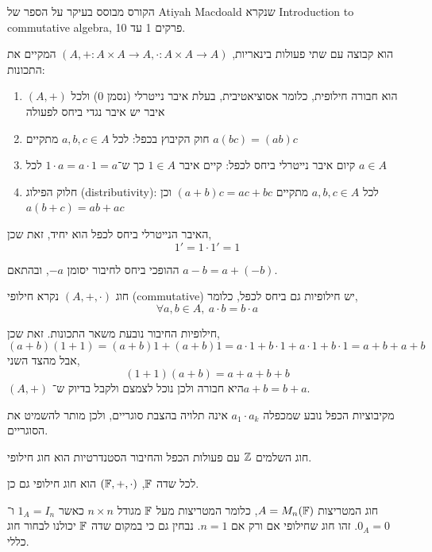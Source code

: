 הקורס מבוסס בעיקר על הספר של Atiyah Macdoald שנקרא Introduction to commutative algebra, פרקים 1 עד 10.
\begin{definition}[חוג]
	הוא קבוצה עם שתי פעולות בינאריות, $(A, + : A \times A \to A, \cdot : A \times A \to A)$ המקיים את התכונות:
	\begin{enumerate}
		\item $(A, +)$ הוא חבורה חילופית, כלומר אסוציאטיבית, בעלת איבר נייטרלי (נסמן $0$) ולכל איבר יש איבר נגדי ביחס לפעולה
		\item חוק הקיבוץ בכפל: לכל $a, b, c \in A$ מתקיים $a (b c) = (a b) c$
		\item קיום איבר נייטרלי ביחס לכפל: קיים איבר $1 \in A$ כך ש־$1 \cdot a = a \cdot 1 = a$ לכל $a \in A$
		\item חלוק הפילוג (distributivity): לכל $a, b, c \in A$ מתקיים $(a + b) c = a c + b c$ וכן $a (b + c) = a b + a c$
	\end{enumerate}
\end{definition}
\begin{remark}
	האיבר הנייטרלי ביחס לכפל הוא יחיד, זאת שכן,
	\[
		1'
		= 1 \cdot 1'
		= 1
	\]
\end{remark}
\begin{notation}
	ההופכי ביחס לחיבור יסומן $-a$, ובהתאם $a - b = a + (-b)$.
\end{notation}
\begin{definition}
	חוג $(A, +, \cdot)$ נקרא חילופי (commutative) יש חילופיות גם ביחס לכפל, כלומר,
	\[
		\forall a, b \in A,\ 
		a \cdot b = b \cdot a
	\]
\end{definition}
\begin{remark}
	חילופיות החיבור נובעת משאר התכונות.
	זאת שכן,
	\[
		(a + b) (1 + 1)
		= (a + b) 1 + (a + b) 1
		= a \cdot 1 + b \cdot 1 + a \cdot 1 + b \cdot 1
		= a + b + a + b
	\]
	אבל מהצד השני,
	\[
		(1 + 1) (a + b)
		= a + a + b + b
	\]
	$(A, +)$ היא חבורה ולכן נוכל לצמצם ולקבל בדיוק ש־$a + b = b + a$.
\end{remark}
\begin{remark}
	מקיבוציות הכפל נובע שמכפלה $a_1 \cdot a_k$ אינה תלויה בהצבת סוגריים, ולכן מותר להשמיט את הסוגריים.
\end{remark}
\begin{example}
	חוג השלמים $\mathbb{Z}$ עם פעולות הכפל והחיבור הסטנדרטיות הוא חוג חילופי.
\end{example}
\begin{example}
	לכל שדה $\mathbb{F}$, $(\mathbb{F}, +, \cdot)$ הוא חוג חילופי גם כן.
\end{example}
\begin{example}
	חוג המטריצות $A = M_n(\mathbb{F})$, כלומר המטריצות מעל $\mathbb{F}$ מגודל $n \times n$ כאשר $1_A = I_n$ ו־$0_A = 0$.
	זהו חוג שחילופי אם ורק אם $n = 1$.
	נבחין גם כי במקום שדה $\mathbb{F}$ יכולנו לבחור חוג כללי.
\end{example}
